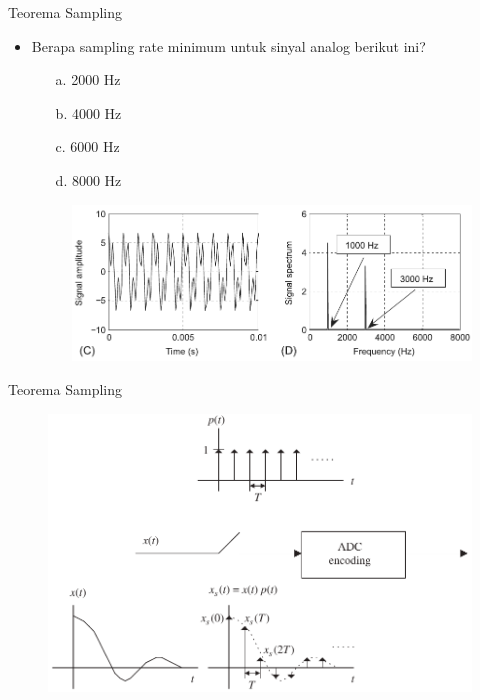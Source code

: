\documentclass[pdflatex,compress,mathserif]{beamer}
\begin{document}
\begin{frame}{Teorema Sampling}
    \begin{itemize}
        \item Berapa sampling rate minimum untuk sinyal analog berikut ini?
        \begin{multicols}{2}
            \begin{enumerate}
                \item[a.] 2000 Hz
                \item[b.] 4000 Hz
                \columnbreak
                \item[c.] 6000 Hz
                \item[d.] 8000 Hz
            \end{enumerate}
        \end{multicols}
        \begin{figure}
            \includegraphics[width=\linewidth]{./img/img07}
        \end{figure}
    \end{itemize}
\end{frame}

\begin{frame}{Teorema Sampling}
    \begin{figure}
        \includegraphics[width=0.9\linewidth]{./img/img08}
    \end{figure}
\end{frame}
\end{document}
